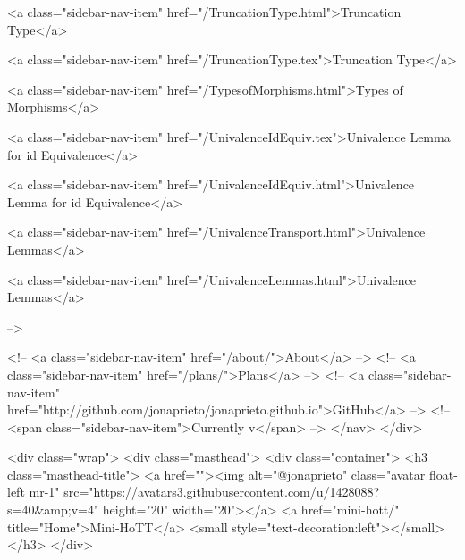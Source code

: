       
    
      
        
          <a class="sidebar-nav-item" href="/TruncationType.html">Truncation Type</a>
        
      
    
      
        
          <a class="sidebar-nav-item" href="/TruncationType.tex">Truncation Type</a>
        
      
    
      
        
          <a class="sidebar-nav-item" href="/TypesofMorphisms.html">Types of Morphisms</a>
        
      
    
      
        
          <a class="sidebar-nav-item" href="/UnivalenceIdEquiv.tex">Univalence Lemma for id Equivalence</a>
        
      
    
      
        
          <a class="sidebar-nav-item" href="/UnivalenceIdEquiv.html">Univalence Lemma for id Equivalence</a>
        
      
    
      
        
          <a class="sidebar-nav-item" href="/UnivalenceTransport.html">Univalence Lemmas</a>
        
      
    
      
        
          <a class="sidebar-nav-item" href="/UnivalenceLemmas.html">Univalence Lemmas</a>
        
      
     -->

    <!-- <a class="sidebar-nav-item" href="/about/">About</a> -->
    <!-- <a class="sidebar-nav-item" href="/plans/">Plans</a> -->
    <!-- <a class="sidebar-nav-item" href="http://github.com/jonaprieto/jonaprieto.github.io">GitHub</a> -->
    <!-- <span class="sidebar-nav-item">Currently v</span> -->
  </nav>
</div>

    <div class="wrap">
      <div class="masthead">
        <div class="container">
          <h3 class="masthead-title">
            <a href=""><img alt="@jonaprieto" class="avatar float-left mr-1" src="https://avatars3.githubusercontent.com/u/1428088?s=40&amp;v=4" height="20" width="20"></a>
            <a href="mini-hott/" title="Home">Mini-HoTT</a>
            <small style="text-decoration:left"></small>
          </h3>
        </div>
      
